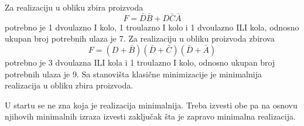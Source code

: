 \begin{frame}[label=02-s045]
\gusttekst
Za realizaciju u obliku zbira proizvoda
\[
F=\bar D\bar B+D\bar C\bar A
\]
potrebno je 1 dvoulazno I kolo, 1 troulazno I kolo i 1 dvoulazno ILI kola, odnosno ukupan broj potrebnih ulaza je 7. Za realizaciju u obliku proizvoda zbirova
\[
F=(D+\bar B)(\bar D+\bar C)(\bar D+\bar A)
\]
potrebno je 3 dvoulazna ILI kola i 1 troulazno I kolo, odnosno ukupan broj potrebnih ulaza je 9. Sa stanovišta klasične minimizacije je minimalnija realizacija u obliku zbira proizvoda.

\alert{U startu se ne zna koja je realizacija minimalnija. Treba izvesti obe pa na osnovu njihovih minimalnih izraza izvesti zaključak šta je zapravo minimalna realizacija.}
\end{frame}
